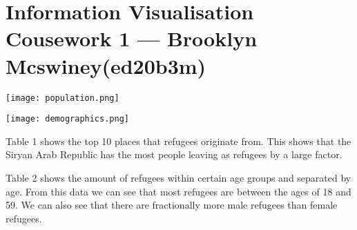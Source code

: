 \documentclass[
	a4paper, %
	11pt, %
]{CSUniSchoolLabReport}
\begin{document}
\section*{Information Visualisation Cousework 1 --- Brooklyn Mcswiney(ed20b3m)}
\begin{table}[h]
	\centering
	\caption{}
	\texttt{[image: population.png]}
\end{table}
\begin{table}[h]
	\centering
	\caption{}
	\texttt{[image: demographics.png]}
\end{table}

\begin{flushleft}
	Table 1 shows the top 10 places that refugees originate from. This shows that the Siryan Arab Republic
	has the most people leaving as refugees by a large factor.

	Table 2 shows the amount of refugees within certain age groups and separated by age. From this data 
	we can see that most refugees are between the ages of 18 and 59. We can also see that there are fractionally more 
	male refugees than female refugees.
\end{flushleft}

\end{document}
